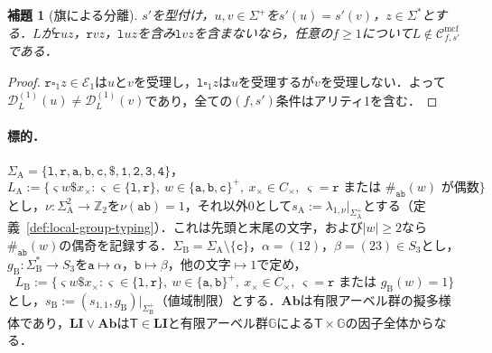 \documentclass[11pt,a4paper]{ltjsarticle}
\numberwithin{equation}{section}
\theoremstyle{plain}
\newtheorem{lemma}[theorem]{補題}
\theoremstyle{definition}
\theoremstyle{remark}
\newcommand{\Cmcf}[2]{\mathcal{C}^{\mathrm{mcf}}_{#1,#2}}
\newcommand{\D}{\mathcal{D}}
\newcommand{\blank}{\square}
\begin{document}
\begin{lemma}[旗による分離]
\label{lem:flag-separation}
$s'$を型付け，$u,v\in\Sigma^+$を$s'(u)=s'(v)$，$z\in\Sigma^*$とする．$L$が$\mathtt ruz$，$\mathtt rvz$，$\mathtt luz$を含み$\mathtt lvz$を含まないなら，任意の$f\ge1$について$L\notin\Cmcf{f}{s'}$である．
\end{lemma}

\begin{proof}
$\mathtt r\blank_1z\in\mathcal E_1$は$u$と$v$を受理し，$\mathtt l\blank_1z$は$u$を受理するが$v$を受理しない．よって$\D^{(1)}_L(u)\ne\D^{(1)}_L(v)$であり，全ての$(f,s')$条件はアリティ1を含む．
\end{proof}

\paragraph{標的．}
$\Sigma_{\mathrm A}=\{\mathtt l,\mathtt r,\mathtt a,\mathtt b,\mathtt c,\mathtt\$,\mathtt 1,\mathtt 2,\mathtt 3,\mathtt 4\}$，
\[
 L_{\mathrm A}:=\{\varsigma w\mathtt\$x_\times:\varsigma\in\{\mathtt l,\mathtt r\},\
 w\in\{\mathtt a,\mathtt b,\mathtt c\}^+,\ x_\times\in C_\times,\
 \varsigma=\mathtt r\text{ または }\#_{\mathtt{ab}}(w)\text{ が偶数}\}
\]
とし，$\nu:\Sigma_{\mathrm A}^2\to\mathbb Z_2$を$\nu(\mathtt{ab})=1$，それ以外$0$として$s_{\mathrm A}:=\lambda_{1,\nu}|_{\Sigma_{\mathrm A}^+}$とする（定義~\ref{def:local-group-typing}）．これは先頭と末尾の文字，および$|w|\ge2$なら$\#_{\mathtt{ab}}(w)$の偶奇を記録する．$\Sigma_{\mathrm B}=\Sigma_{\mathrm A}\setminus\{\mathtt c\}$，$\alpha=(12)$，$\beta=(23)\in S_3$とし，$g_{\mathrm B}:\Sigma_{\mathrm B}^*\to S_3$を$\mathtt a\mapsto\alpha$，$\mathtt b\mapsto\beta$，他の文字$\mapsto1$で定め，
\[
 L_{\mathrm B}:=\{\varsigma w\mathtt\$x_\times:\varsigma\in\{\mathtt l,\mathtt r\},\
 w\in\{\mathtt a,\mathtt b\}^+,\ x_\times\in C_\times,\
 \varsigma=\mathtt r\text{ または }g_{\mathrm B}(w)=1\}
\]
とし，$s_{\mathrm B}:=(s_{1,1},g_{\mathrm B})|_{\Sigma_{\mathrm B}^+}$（値域制限）とする．$\mathbf{Ab}$は有限アーベル群の擬多様体であり，$\mathbf{LI}\vee\mathbf{Ab}$は$\mathsf T\in\mathbf{LI}$と有限アーベル群${\mathbb G}$による$\mathsf T\times {\mathbb G}$の因子全体からなる．
\end{document}
